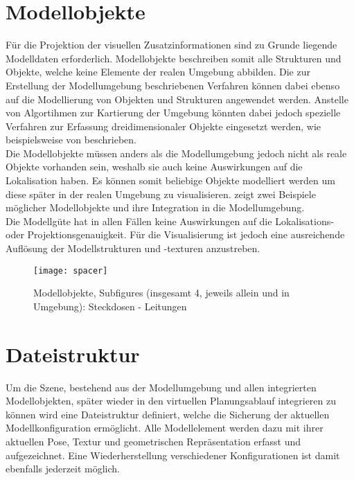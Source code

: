 \section{Modellobjekte}
Für die Projektion der visuellen Zusatzinformationen sind zu Grunde liegende Modelldaten erforderlich. Modellobjekte beschreiben somit alle Strukturen und Objekte, welche keine Elemente der realen Umgebung abbilden. Die zur Erstellung der Modellumgebung beschriebenen Verfahren können dabei ebenso auf die Modellierung von Objekten und Strukturen angewendet werden. Anstelle von Algortihmen zur Kartierung der Umgebung könnten dabei jedoch spezielle Verfahren zur Erfassung dreidimensionaler Objekte eingesetzt werden, wie beispielsweise von \cite{Xu2012} beschrieben.\\
Die Modellobjekte müssen anders als die Modellumgebung jedoch nicht als reale Objekte vorhanden sein, weshalb sie auch keine Auswirkungen auf die Lokalisation haben. Es können somit beliebige Objekte modelliert werden um diese später in der realen Umgebung zu visualisieren.  zeigt zwei Beispiele möglicher Modellobjekte und ihre Integration in die Modellumgebung.\\
Die Modellgüte hat in allen Fällen keine Auswirkungen auf die Lokalisations- oder Projektionsgenauigkeit. Für die Visualisierung ist jedoch eine ausreichende Auflösung der Modellstrukturen und -texturen anzustreben.\\

\begin{figure}[ht]
	\begin{center}
		\texttt{[image: spacer]}
		\caption{Modellobjekte, Subfigures (insgesamt 4, jeweils allein und in Umgebung): Steckdosen - Leitungen}
		\label{fig.modobj}
	\end{center}
\end{figure}

\section{Dateistruktur}
Um die Szene, bestehend aus der Modellumgebung und allen integrierten Modellobjekten, später wieder in den virtuellen Planungsablauf integrieren zu können wird eine Dateistruktur definiert, welche die Sicherung der aktuellen Modellkonfiguration ermöglicht. Alle Modellelement werden dazu mit ihrer aktuellen Pose, Textur und geometrischen Repräsentation erfasst und aufgezeichnet. Eine Wiederherstellung verschiedener Konfigurationen ist damit ebenfalls jederzeit möglich.\\
